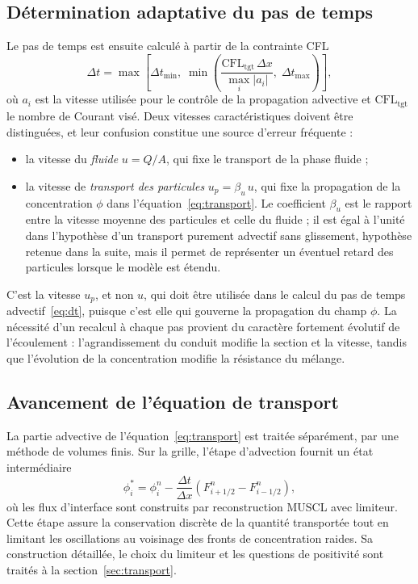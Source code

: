 \documentclass[11pt,a4paper]{report}
\newcommand{\dt}{\Delta t}
\begin{document}
\subsection{Détermination adaptative du pas de temps}
\label{sec:dt-adaptatif}

Le pas de temps est ensuite calculé à partir de la contrainte CFL
\begin{equation}
\dt = \max\left[\dt_{\min},\;
\min\left(\frac{\mathrm{CFL}_{\mathrm{tgt}}\,\Delta x}{\max_i|a_i|},\;\dt_{\max}\right)\right],
\label{eq:dt}
\end{equation}
où \(a_i\) est la vitesse utilisée pour le contrôle de la propagation advective et
\(\mathrm{CFL}_{\mathrm{tgt}}\) le nombre de Courant visé. Deux vitesses caractéristiques doivent être
distinguées, et leur confusion constitue une source d'erreur fréquente :
\begin{itemize}
  \item la vitesse du \emph{fluide} \(u = Q/A\), qui fixe le transport de la phase fluide ;
  \item la vitesse de \emph{transport des particules} \(u_p = \beta_u\,u\), qui fixe la propagation de la
        concentration \(\phi\) dans l'équation~\eqref{eq:transport}. Le coefficient \(\beta_u\) est le
        rapport entre la vitesse moyenne des particules et celle du fluide ; il est égal à l'unité dans
        l'hypothèse d'un transport purement advectif sans glissement, hypothèse retenue dans la suite, mais
        il permet de représenter un éventuel retard des particules lorsque le modèle est étendu.
\end{itemize}
C'est la vitesse \(u_p\), et non \(u\), qui doit être utilisée dans le calcul du pas de temps
advectif~\eqref{eq:dt}, puisque c'est elle qui gouverne la propagation du champ \(\phi\). La nécessité
d'un recalcul à chaque pas provient du caractère fortement évolutif de l'écoulement : l'agrandissement du
conduit modifie la section et la vitesse, tandis que l'évolution de la concentration modifie la résistance
du mélange.

\subsection{Avancement de l'équation de transport}

La partie advective de l'équation~\eqref{eq:transport} est traitée séparément, par une méthode de volumes
finis. Sur la grille, l'étape d'advection fournit un état intermédiaire
\begin{equation}
\phi_i^* = \phi_i^n - \frac{\dt}{\Delta x}\left(F_{i+1/2}^n - F_{i-1/2}^n\right),
\label{eq:advection}
\end{equation}
où les flux d'interface sont construits par reconstruction MUSCL avec limiteur. Cette étape assure la
conservation discrète de la quantité transportée tout en limitant les oscillations au voisinage des fronts
de concentration raides. Sa construction détaillée, le choix du limiteur et les questions de positivité
sont traités à la section~\ref{sec:transport}.
\end{document}
